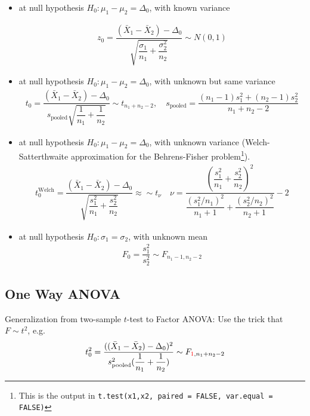 \begin{itemize}[topsep=2pt,itemsep=0pt]
    \item at null hypothesis $ H_0: \mu _1-\mu _2 = \Delta_0 $, with known variance
    
    \begin{align*}
         z_0=\dfrac{ (\bar{X}_1-\bar{X}_2)-\Delta _0 }{ \sqrt{\dfrac{ \sigma _1 }{ n_1 }+\dfrac{ \sigma _2^2 }{ n_2 }  } } \sim N(0,1) 
    \end{align*}
    \item at null hypothesis $ H_0: \mu _1-\mu _2 = \Delta_0 $, with unknown but same variance
    \begin{align*}
        t_0 = \dfrac{ (\bar{X}_1-\bar{X}_2)-\Delta _0 }{ s_\mathrm{ pooled }\sqrt{\dfrac{ 1 }{ n_1 } + \dfrac{ 1 }{ n_2 }  }  }\sim t_{n_1+n_2-2},\quad s_\mathrm{ pooled }=\dfrac{ (n_1-1)s_1^2+(n_2-1)s_2^2 }{ n_1+n_2-2 }  
    \end{align*}
    \item at null hypothesis $ H_0: \mu _1-\mu _2 = \Delta_0 $, with unknown variance (Welch-Satterthwaite approximation for the  Behrens-Fisher problem\footnote{This is the output in \lstinline|t.test(x1,x2, paired = FALSE, var.equal = FALSE)|}).
    \begin{align*}
         t_0^\text{Welch}=\dfrac{ (\bar{X}_1-\bar{X}_2)-\Delta _0 }{ \sqrt{\dfrac{ s_1^2 }{ n_1 }+\dfrac{ s_2^2 }{ n_2 }  } }\approx \sim t_\nu\quad \nu = \dfrac{ \left(\dfrac{ s_1^2 }{ n_1 }+\dfrac{ s_2^2 }{ n_2 }\right)^2 }{ \dfrac{ (s_1^2/n_1)^2 }{ n_1+1 }+\dfrac{ (s_2^2/n_2)^2 }{ n_2+1 }   }-2  
    \end{align*}
    \item at null hypothesis $ H_0: \sigma _1=\sigma _2 $, with unknown mean
    \begin{align*}
        F_0=\dfrac{ s_1^2 }{ s_2^2 }\sim F_{n_1-1,n_2-2}  
    \end{align*}
    
\end{itemize}


\subsection{One Way ANOVA}\label{SubSubSectionDoEOneWayANOVA}

Generalization from two-sample $ t $-test to Factor ANOVA: Use the trick that $ F\sim t^2 $, e.g. 
\begin{align*}
    t_0^2 =\dfrac{( (\bar{X}_1-\bar{X}_2)-\Delta _0)^2 }{ s^2_\mathrm{ pooled }(\dfrac{ 1 }{ n_1 } + \dfrac{ 1 }{ n_2 }  )}\sim F_{{\color{red}1},n_1+n_2-2}
\end{align*}

